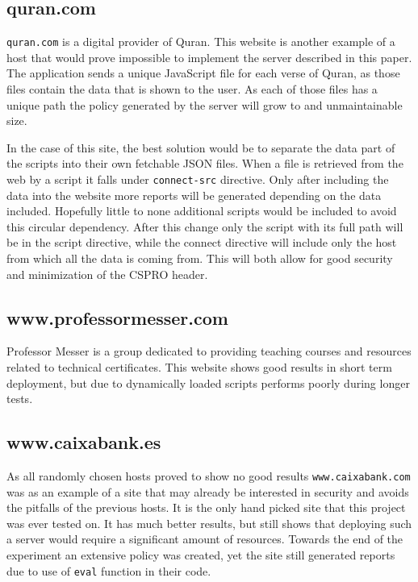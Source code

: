\subsection{quran.com}

\texttt{quran.com} is a digital provider of Quran. 
This website is another example of a host that would prove impossible to implement the server described in this paper.
The application sends a unique JavaScript file for each verse of Quran, as those files contain the data that is shown to the user.
As each of those files has a unique path the policy generated by the server will grow to and unmaintainable size.

In the case of this site, the best solution would be to separate the data part of the scripts into their own fetchable JSON files.
When a file is retrieved from the web by a script it falls under \texttt{connect-src} directive. 
Only after including the data into the website more reports will be generated depending on the data included.
Hopefully little to none additional scripts would be included to avoid this circular dependency.
After this change only the script with its full path will be in the script directive, while the connect directive will include only the host from which all the data is coming from.
This will both allow for good security and minimization of the CSPRO header.

\subsection{www.professormesser.com}

Professor Messer is a group dedicated to providing teaching courses and resources related to technical certificates.
This website shows good results in short term deployment, but due to dynamically loaded scripts performs poorly during longer tests.


\subsection{www.caixabank.es}

As all randomly chosen hosts proved to show no good results \texttt{www.caixabank.com} was as an example of a site that may already be interested in security and avoids the pitfalls of the previous hosts.
It is the only hand picked site that this project was ever tested on. 
It has much better results, but still shows that deploying such a server would require a significant amount of resources.
Towards the end of the experiment an extensive policy was created, yet the site still generated reports due to use of \texttt{eval} function in their code.

